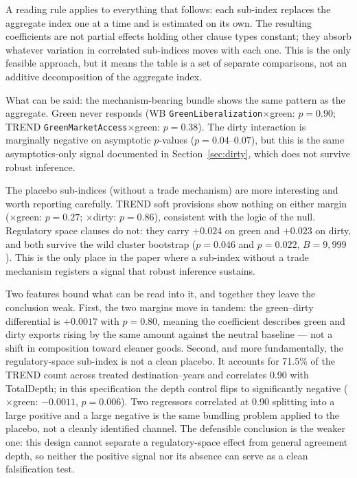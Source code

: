 \documentclass[12pt]{article}
\begin{document}
A reading rule applies to everything that follows: each sub-index replaces the aggregate
index one at a time and is estimated on its own. The resulting coefficients are not
partial effects holding other clause types constant; they absorb whatever variation in
correlated sub-indices moves with each one. This is the only feasible approach, but it
means the table is a set of separate comparisons, not an additive decomposition of the
aggregate index.

What can be said: the mechanism-bearing bundle shows the same pattern as the aggregate.
Green never responds (WB \texttt{GreenLiberalization}$\times$green: $p = 0.90$; TREND
\texttt{GreenMarketAccess}$\times$green: $p = 0.38$). The dirty interaction is marginally
negative on asymptotic $p$-values ($p = 0.04$--$0.07$), but this is the same
asymptotics-only signal documented in Section~\ref{sec:dirty}, which does not survive
robust inference.

The placebo sub-indices (without a trade mechanism) are more interesting and worth
reporting carefully. TREND soft provisions show nothing on either margin ($\times$green:
$p = 0.27$; $\times$dirty: $p = 0.86$), consistent with the logic of the null. Regulatory
space clauses do not: they carry $+0.024$ on green and $+0.023$ on dirty, and both survive
the wild cluster bootstrap ($p = 0.046$ and $p = 0.022$, $B = 9{,}999$). This is the only
place in the paper where a sub-index without a trade mechanism registers a signal that
robust inference sustains.

Two features bound what can be read into it, and together they leave the conclusion weak.
First, the two margins move in tandem: the green--dirty differential is $+0.0017$ with
$p = 0.80$, meaning the coefficient describes green and dirty exports rising by the same
amount against the neutral baseline --- not a shift in composition toward cleaner goods.
Second, and more fundamentally, the regulatory-space sub-index is not a clean placebo.
It accounts for 71.5\% of the TREND count across treated destination--years and
correlates 0.90 with TotalDepth; in this specification the depth control flips to
significantly negative ($\times$green: $-0.0011$, $p = 0.006$). Two regressors correlated
at 0.90 splitting into a large positive and a large negative is the same bundling problem
applied to the placebo, not a cleanly identified channel. The defensible conclusion is the
weaker one: this design cannot separate a regulatory-space effect from general agreement
depth, so neither the positive signal nor its absence can serve as a clean falsification
test.
\end{document}
